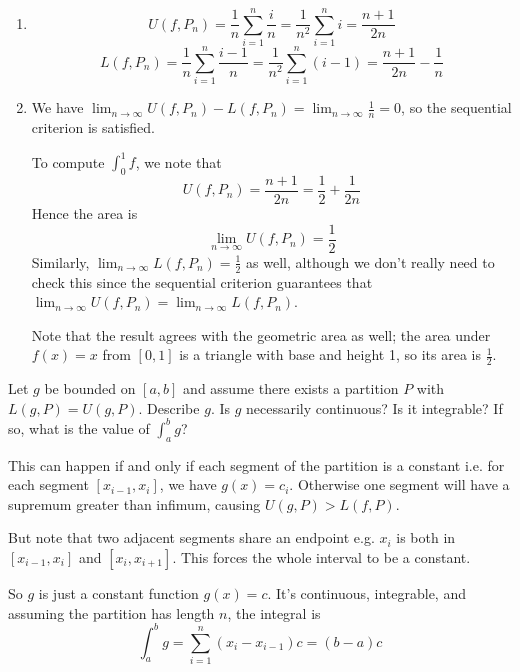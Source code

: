 \documentclass{oxmathproblems}
\begin{document}
\begin{questions}
\begin{solution}
\begin{enumerate}[label=(\alph*)]
    A similar argument can be used to show that $\lim_{n \to \infty}L(f, P_{n}) = L(f)$. Now we can apply the Algebraic Limit Theorem to conclude that
    $\lim_{n \to \infty} [U(f, P_{n}) - L(f, P_{n})] = 0 \implies \lim_{n \to \infty}U(f, P_{n}) = \lim_{n \to \infty}L(f, P_{n})$.
  
    \item \[U(f, P_{n}) = \frac{1}{n}\sum_{i=1}^{n}\frac{i}{n}=\frac{1}{n^2}\sum_{i=1}^{n}i=\frac{n+1}{2n}\]
    \[L(f, P_{n}) = \frac{1}{n}\sum_{i=1}^{n}\frac{i-1}{n}=\frac{1}{n^2}\sum_{i=1}^{n}(i-1)=\frac{n+1}{2n}-\frac{1}{n}\]
  
    \item We have $\lim_{n \to \infty}U(f, P_{n})-L(f, P_{n}) = \lim_{n \to \infty}\frac{1}{n} = 0$, so the sequential criterion is satisfied.
    
    To compute $\int_{0}^{1}f$, we note that
    \[U(f, P_{n}) = \frac{n+1}{2n} = \frac{1}{2} + \frac{1}{2n}\]
    Hence the area is
    \[\lim_{n \to \infty}U(f, P_{n}) = \frac{1}{2}\]
    Similarly, $\lim_{n \to \infty}L(f, P_{n})=\frac{1}{2}$ as well, although we don't really need to check this since the sequential criterion
    guarantees that $\lim_{n \to \infty}U(f, P_{n}) = \lim_{n \to \infty}L(f, P_{n})$.

    Note that the result agrees with the geometric area as well; the area under $f(x)=x$ from $[0, 1]$ is a triangle with base and height 1, so its
    area is $\frac{1}{2}$.
  \end{enumerate}
\end{solution}

\miquestion Let $g$ be bounded on $[a, b]$ and assume there exists a partition $P$ with $L(g, P)=U(g, P)$. Describe $g$. Is $g$ necessarily continuous? Is it integrable?
If so, what is the value of $\int_{a}^{b}g$?

\begin{solution}
  This can happen if and only if each segment of the partition is a constant i.e. for each segment $[x_{i-1}, x_{i}]$, we have $g(x)=c_{i}$.
  Otherwise one segment will have a supremum greater than infimum, causing $U(g, P) > L(f, P)$.

  But note that two adjacent segments share an endpoint e.g. $x_{i}$ is both in $[x_{i-1}, x_{i}]$ and $[x_{i}, x_{i+1}]$. This forces the
  whole interval to be a constant.

  So $g$ is just a constant function $g(x)=c$. It's continuous, integrable, and assuming the partition has length $n$, the integral is
  \[\int_{a}^{b}g = \sum_{i=1}^{n}(x_{i}-x_{i-1})c = (b-a)c\]
\end{solution}


\end{questions}
\end{document}
